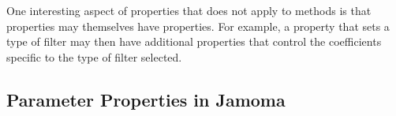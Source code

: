 \documentclass{article}
\begin{document}
One interesting aspect of properties that does not apply to methods is that properties may themselves have properties. For example, a property that sets a type of filter may then have additional properties that control the coefficients specific to the type of filter selected.


\subsection{Parameter Properties in Jamoma} %

\end{document}
